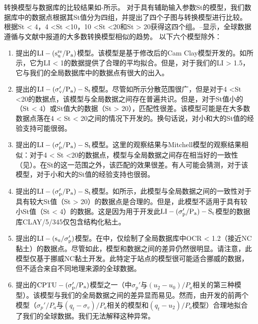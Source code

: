 \begin{paracol}{2}
    \switchcolumn
        
    转换模型与数据库的比较结果如-所示。 对于具有辅助输入参数St的模型，我们数据库中的数据点根据其St值分为四组，并提出了四个子图与转换模型进行比较。 根据St < 4，4 <St <10，10 <St <20和St > 20获得这四个组。–显示，全球数据遵循与文献中报道的大多数转换模型相似的趋势。 以下六个模型除外：
    \begin{enumerate}
        \item \citet{Wroth1978137}提出的$\rm{LI}-(s_u^{re}/P_a)$模型。该模型是基于修改后的Cam Clay模型开发的。如所示，它为LI < 1的数据提供了合理的平均拟合。但是，对于我们的LI > 1.5，它与我们的全局数据库中的数据点有很大的出入。
        
        \item \citet{Mitchell1993}提出的$\rm{LI}-(\sigma_v'/P_a)-S_t$模型。尽管如所示分散范围很广，但是对于4 <St <20的数据点，该模型与全局数据之间存在普遍共识。但是，对于St值小的（St < 4）或St值大的数据（St > 20），匹配性很差。该模型可能是在大多数数据点落在4 < St < 20之间的情况下开发的。换句话说，对小和大的St值的经验支持可能很弱。
        
        \item \citet{NAVFAC1982}提出的$\rm{LI}-(\sigma_p'/P_a)-S_t$模型。这里的观察结果与Mitchell模型的观察结果相似：对于4 < St <20的数据点，模型与全局数据之间存在相当好的一致性（见）。在St的这一范围之外，该匹配的效果很差。有人可能会猜测，对于该模型，对于小和大的St值的经验支持也很弱。
        
        \item \citet{Ching2012522}提出的$\rm{LI}-(\sigma_p'/P_a)-S_t$模型。如所示，此模型与全局数据之间的一致性对于具有较大St值（St > 20）的数据点是合理的。但是，此模型不适用于具有较小St值（St < 4）的数据。这是因为用于开发此$\rm{LI}-(\sigma_p'/P_a)-S_t$模型的数据库CLAY/5/345仅包含结构化粘土。
        
        \item \citet{Bjerrum1960711}提出的$\rm{LI}-(s_u/\sigma_p')$模型。在中，仅绘制了全局数据库中OCR < 1.2（接近NC黏土）的数据点。尽管如此，模型和数据之间的差异仍然很明显。请注意，此模型仅基于挪威NC黏土开发。此特定于站点的模型很可能适合挪威的数据，但不适合来自不同地理来源的全球数据。
        
        \item \citet{Chen1996488}提出的$\rm{CPTU}-(\sigma_p'/P_a)$模型之一（中$\sigma_p'$与$(u_2-u_0)/P_a$相关的第三种模型）。该模型与我们的全局数据之间的差异显而易见。然而，由\citet{Chen1996488}开发的前两个模型（$\sigma_p'/P_a$与$(q_t-\sigma_v)/P_a$相关的模型和$(q_t-u_2)/P_a$模型）合理地拟合了我们的全球数据。我们无法解释这种异常。
    \end{enumerate}

\end{paracol}
